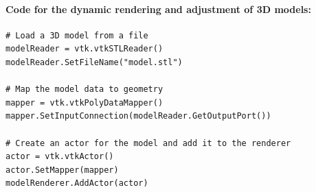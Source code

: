 \documentclass[12pt]{article}
\begin{document}
\begin{enumerate}
\begin{enumerate}
\begin{itemize}
                                    \paragraph{Code for the dynamic rendering and adjustment of 3D models:}
                                    \begin{verbatim}
# Load a 3D model from a file
modelReader = vtk.vtkSTLReader()
modelReader.SetFileName("model.stl")

# Map the model data to geometry
mapper = vtk.vtkPolyDataMapper()
mapper.SetInputConnection(modelReader.GetOutputPort())

# Create an actor for the model and add it to the renderer
actor = vtk.vtkActor()
actor.SetMapper(mapper)
modelRenderer.AddActor(actor)


\end{verbatim}
\end{itemize}
\end{enumerate}
\end{enumerate}
\end{document}
